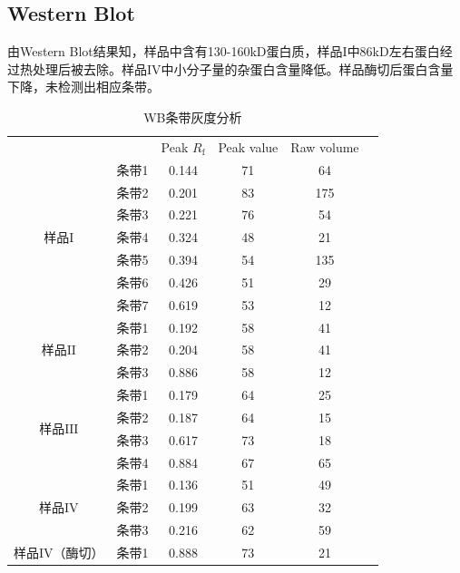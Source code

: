 \subsection{Western Blot}
\par 由Western Blot结果知，样品中含有130-160kD蛋白质，样品$\mathrm{I}$中86kD左右蛋白经过热处理后被去除。样品$\mathrm{IV}$中小分子量的杂蛋白含量降低。样品酶切后蛋白含量下降，未检测出相应条带。
\begin{table}[]
\centering
\caption{WB条带灰度分析}
\label{491}
\begin{tabular}{@{}cccccl@{}}
\toprule
                     &     & Peak $R_\text{f}$ & Peak value & Raw volume &  \\ \cmidrule(lr){1-5}
\multirow{7}{*}{样品$\mathrm{I}$} & 条带1 & 0.144   & 71         & 64         &  \\
                     & 条带2 & 0.201   & 83         & 175        &  \\
                     & 条带3 & 0.221   & 76         & 54         &  \\
                     & 条带4 & 0.324   & 48         & 21         &  \\
                     & 条带5 & 0.394   & 54         & 135        &  \\
                     & 条带6 & 0.426   & 51         & 29         &  \\
                     & 条带7 & 0.619   & 53         & 12         &  \\  \cmidrule(lr){1-5}
\multirow{3}{*}{样品$\mathrm{II}$} & 条带1 & 0.192   & 58         & 41         &  \\
                     & 条带2 & 0.204   & 58         & 41         &  \\
                     & 条带3 & 0.886   & 58         & 12         &  \\  \cmidrule(lr){1-5}
\multirow{4}{*}{样品$\mathrm{III}$} & 条带1 & 0.179   & 64         & 25         &  \\
                     & 条带2 & 0.187   & 64         & 15         &  \\
                     & 条带3 & 0.617   & 73         & 18         &  \\
                     & 条带4 & 0.884   & 67         & 65         &  \\  \cmidrule(lr){1-5}
\multirow{3}{*}{样品$\mathrm{IV}$} & 条带1 & 0.136   & 51         & 49         &  \\
                     & 条带2 & 0.199   & 63         & 32         &  \\
                     & 条带3 & 0.216   & 62         & 59         &  \\  \cmidrule(lr){1-5}
样品$\mathrm{IV}$（酶切）              & 条带1 & 0.888   & 73         & 21         & \\ \cmidrule(lr){1-5}
\end{tabular}
\end{table}

